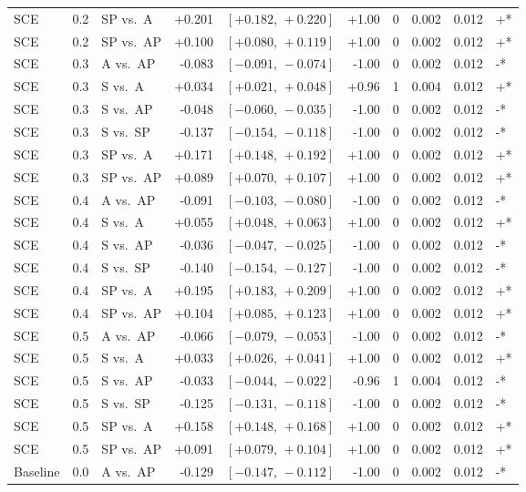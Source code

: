 \begin{landscape}
\begin{scriptsize}
\begin{longtable}{lllrrrrrrl}
SCE & 0.2 & SP vs.\ A & +0.201 & $[+0.182,\,+0.220]$ & +1.00 & 0 & 0.002 & 0.012 & +* \\
SCE & 0.2 & SP vs.\ AP & +0.100 & $[+0.080,\,+0.119]$ & +1.00 & 0 & 0.002 & 0.012 & +* \\
SCE & 0.3 & A vs.\ AP & -0.083 & $[-0.091,\,-0.074]$ & -1.00 & 0 & 0.002 & 0.012 & -* \\
SCE & 0.3 & S vs.\ A & +0.034 & $[+0.021,\,+0.048]$ & +0.96 & 1 & 0.004 & 0.012 & +* \\
SCE & 0.3 & S vs.\ AP & -0.048 & $[-0.060,\,-0.035]$ & -1.00 & 0 & 0.002 & 0.012 & -* \\
SCE & 0.3 & S vs.\ SP & -0.137 & $[-0.154,\,-0.118]$ & -1.00 & 0 & 0.002 & 0.012 & -* \\
SCE & 0.3 & SP vs.\ A & +0.171 & $[+0.148,\,+0.192]$ & +1.00 & 0 & 0.002 & 0.012 & +* \\
SCE & 0.3 & SP vs.\ AP & +0.089 & $[+0.070,\,+0.107]$ & +1.00 & 0 & 0.002 & 0.012 & +* \\
SCE & 0.4 & A vs.\ AP & -0.091 & $[-0.103,\,-0.080]$ & -1.00 & 0 & 0.002 & 0.012 & -* \\
SCE & 0.4 & S vs.\ A & +0.055 & $[+0.048,\,+0.063]$ & +1.00 & 0 & 0.002 & 0.012 & +* \\
SCE & 0.4 & S vs.\ AP & -0.036 & $[-0.047,\,-0.025]$ & -1.00 & 0 & 0.002 & 0.012 & -* \\
SCE & 0.4 & S vs.\ SP & -0.140 & $[-0.154,\,-0.127]$ & -1.00 & 0 & 0.002 & 0.012 & -* \\
SCE & 0.4 & SP vs.\ A & +0.195 & $[+0.183,\,+0.209]$ & +1.00 & 0 & 0.002 & 0.012 & +* \\
SCE & 0.4 & SP vs.\ AP & +0.104 & $[+0.085,\,+0.123]$ & +1.00 & 0 & 0.002 & 0.012 & +* \\
SCE & 0.5 & A vs.\ AP & -0.066 & $[-0.079,\,-0.053]$ & -1.00 & 0 & 0.002 & 0.012 & -* \\
SCE & 0.5 & S vs.\ A & +0.033 & $[+0.026,\,+0.041]$ & +1.00 & 0 & 0.002 & 0.012 & +* \\
SCE & 0.5 & S vs.\ AP & -0.033 & $[-0.044,\,-0.022]$ & -0.96 & 1 & 0.004 & 0.012 & -* \\
SCE & 0.5 & S vs.\ SP & -0.125 & $[-0.131,\,-0.118]$ & -1.00 & 0 & 0.002 & 0.012 & -* \\
SCE & 0.5 & SP vs.\ A & +0.158 & $[+0.148,\,+0.168]$ & +1.00 & 0 & 0.002 & 0.012 & +* \\
SCE & 0.5 & SP vs.\ AP & +0.091 & $[+0.079,\,+0.104]$ & +1.00 & 0 & 0.002 & 0.012 & +* \\
Baseline & 0.0 & A vs.\ AP & -0.129 & $[-0.147,\,-0.112]$ & -1.00 & 0 & 0.002 & 0.012 & -* \\

\end{longtable}
\end{scriptsize}
\end{landscape}
